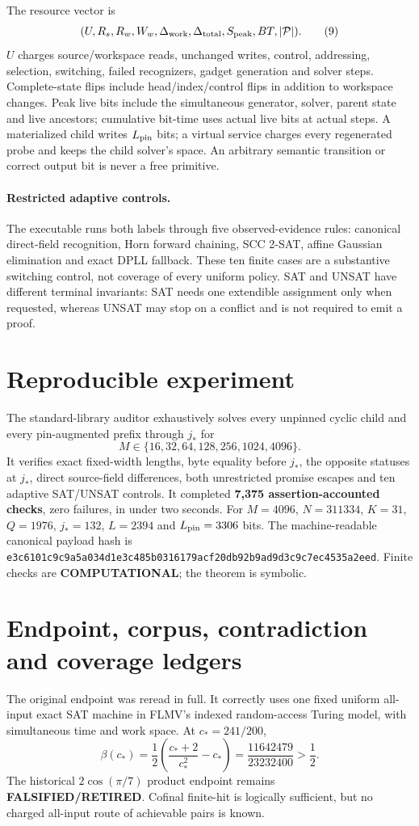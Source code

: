 \documentclass[11pt]{article}
\begin{document}
The resource vector is
\[
(U,R_s,R_w,W_w,\Delta_{\rm work},\Delta_{\rm total},S_{\rm peak},BT,
 |\mathcal P|).
\tag{9}
\]
$U$ charges source/workspace reads, unchanged writes, control, addressing,
selection, switching, failed recognizers, gadget generation and solver
steps.  Complete-state flips include head/index/control flips in addition to
workspace changes.  Peak live bits include the simultaneous generator,
solver, parent state and live ancestors; cumulative bit-time uses actual
live bits at actual steps.  A materialized child writes $L_{\rm pin}$ bits;
a virtual service charges every regenerated probe and keeps the child
solver's space.  An arbitrary semantic transition or correct output bit is
never a free primitive.

\paragraph{Restricted adaptive controls.}
The executable runs both labels through five observed-evidence rules:
canonical direct-field recognition, Horn forward chaining, SCC 2-SAT,
affine Gaussian elimination and exact DPLL fallback.  These ten finite cases
are a substantive switching control, not coverage of every uniform policy.
SAT and UNSAT have different terminal invariants: SAT needs one extendible
assignment only when requested, whereas UNSAT may stop on a conflict and is
not required to emit a proof.

\section{Reproducible experiment}
The standard-library auditor exhaustively solves every unpinned cyclic child
and every pin-augmented prefix through $j_*$ for
\[
M\in\{16,32,64,128,256,1024,4096\}.
\]
It verifies exact fixed-width lengths, byte equality before $j_*$, the
opposite statuses at $j_*$, direct source-field differences, both unrestricted
promise escapes and ten adaptive SAT/UNSAT controls.  It completed
\textbf{7,375 assertion-accounted checks}, zero failures, in under two
seconds.  For $M=4096$, $N=311334$, $K=31$, $Q=1976$, $j_*=132$,
$L=2394$ and $L_{\rm pin}=3306$ bits.  The machine-readable canonical
payload hash is
\texttt{e3c6101c9c9a5a034d1e3c485b0316179acf20db92b9ad9d3c9c7ec4535a2eed}.
Finite checks are \textbf{COMPUTATIONAL}; the theorem is symbolic.

\section{Endpoint, corpus, contradiction and coverage ledgers}
The original  endpoint was reread in full.  It correctly
uses one fixed uniform all-input exact SAT machine in FLMV's indexed
random-access Turing model, with simultaneous time and work space.  At
$c_*=241/200$,
\[
 \beta(c_*)=\frac12\left(\frac{c_*+2}{c_*^2}-c_*\right)
 =\frac{11642479}{23232400}>\frac12.
\]
The historical $2\cos(\pi/7)$ product endpoint remains
\textbf{FALSIFIED/RETIRED}.  Cofinal finite-hit is logically sufficient,
but no charged all-input route of achievable pairs is known.
\end{document}
